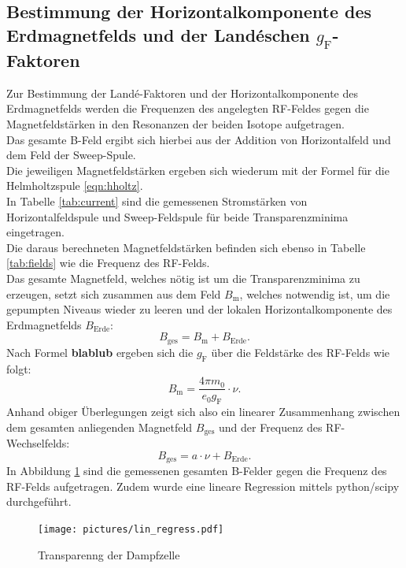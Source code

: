 \subsection{Bestimmung der Horizontalkomponente des Erdmagnetfelds und der Landéschen $g_{\mathrm{F}}$-Faktoren}
Zur Bestimmung der Landé-Faktoren und der Horizontalkomponente des Erdmagnetfelds werden die Frequenzen des angelegten RF-Feldes gegen die Magnetfeldstärken in den Resonanzen der beiden Isotope aufgetragen.\\
Das gesamte B-Feld ergibt sich hierbei aus der Addition von Horizontalfeld und dem Feld der Sweep-Spule.\\
Die jeweiligen Magnetfeldstärken ergeben sich wiederum mit der Formel für die Helmholtzspule \ref{eqn:hholtz}.\\
In Tabelle \ref{tab:current} sind die gemessenen Stromstärken von Horizontalfeldspule und Sweep-Feldspule für beide Transparenzminima eingetragen.\\
Die daraus berechneten Magnetfeldstärken befinden sich ebenso in Tabelle \ref{tab:fields} wie die Frequenz des RF-Felds.\\
Das gesamte Magnetfeld, welches nötig ist um die Transparenzminima zu erzeugen, setzt sich zusammen aus dem Feld $B_{\mathrm{m}}$, welches notwendig ist, um die gepumpten Niveaus wieder zu leeren und der lokalen Horizontalkomponente des Erdmagnetfelds $B_{\mathrm{Erde}}$:
\begin{equation}
B_{\mathrm{ges}}=B_{\mathrm{m}}+B_{\mathrm{Erde}}\mathrm{.}
\end{equation}
Nach Formel \textbf{blablub} ergeben sich die $g_{\mathrm{F}}$ über die Feldstärke des RF-Felds wie folgt:
\begin{equation}
  B_{\mathrm{m}}=\frac{4\pi m_0}{e_0 g_{\mathrm{F}}}\cdot \nu \mathrm{.}
\end{equation}
Anhand obiger Überlegungen zeigt sich also ein linearer Zusammenhang zwischen dem gesamten anliegenden Magnetfeld $B_{\mathrm{ges}}$ und der Frequenz des RF-Wechselfelds:
\begin{equation}
    B_{\mathrm{ges}}=a\cdot \nu+B_{\mathrm{Erde}} \mathrm{.}
\end{equation}
In Abbildung \ref{fig:regress} sind die gemessenen gesamten B-Felder gegen die Frequenz des RF-Felds aufgetragen. Zudem wurde eine lineare Regression mittels python/scipy \cite{scipy} durchgeführt.
\begin{figure}
  \centering
  \texttt{[image: pictures/lin\_regress.pdf]}
  \caption{Transparenng der Dampfzelle}
  \label{fig:regress}
\end{figure}

